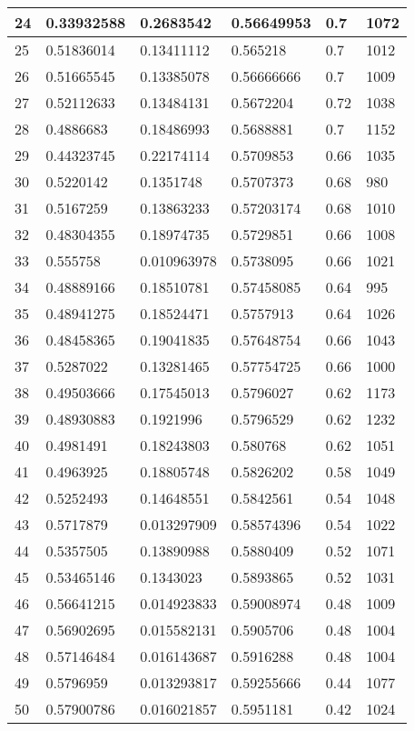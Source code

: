 \begin{longtable}{|l|l|l|l|l|l|}
24 & 0.33932588 & 0.2683542 & 0.56649953 & 0.7 & 1072 \\ \hline 
25 & 0.51836014 & 0.13411112 & 0.565218 & 0.7 & 1012 \\ \hline 
26 & 0.51665545 & 0.13385078 & 0.56666666 & 0.7 & 1009 \\ \hline 
27 & 0.52112633 & 0.13484131 & 0.5672204 & 0.72 & 1038 \\ \hline 
28 & 0.4886683 & 0.18486993 & 0.5688881 & 0.7 & 1152 \\ \hline 
29 & 0.44323745 & 0.22174114 & 0.5709853 & 0.66 & 1035 \\ \hline 
30 & 0.5220142 & 0.1351748 & 0.5707373 & 0.68 & 980 \\ \hline 
31 & 0.5167259 & 0.13863233 & 0.57203174 & 0.68 & 1010 \\ \hline 
32 & 0.48304355 & 0.18974735 & 0.5729851 & 0.66 & 1008 \\ \hline 
33 & 0.555758 & 0.010963978 & 0.5738095 & 0.66 & 1021 \\ \hline 
34 & 0.48889166 & 0.18510781 & 0.57458085 & 0.64 & 995 \\ \hline 
35 & 0.48941275 & 0.18524471 & 0.5757913 & 0.64 & 1026 \\ \hline 
36 & 0.48458365 & 0.19041835 & 0.57648754 & 0.66 & 1043 \\ \hline 
37 & 0.5287022 & 0.13281465 & 0.57754725 & 0.66 & 1000 \\ \hline 
38 & 0.49503666 & 0.17545013 & 0.5796027 & 0.62 & 1173 \\ \hline 
39 & 0.48930883 & 0.1921996 & 0.5796529 & 0.62 & 1232 \\ \hline 
40 & 0.4981491 & 0.18243803 & 0.580768 & 0.62 & 1051 \\ \hline 
41 & 0.4963925 & 0.18805748 & 0.5826202 & 0.58 & 1049 \\ \hline 
42 & 0.5252493 & 0.14648551 & 0.5842561 & 0.54 & 1048 \\ \hline 
43 & 0.5717879 & 0.013297909 & 0.58574396 & 0.54 & 1022 \\ \hline 
44 & 0.5357505 & 0.13890988 & 0.5880409 & 0.52 & 1071 \\ \hline 
45 & 0.53465146 & 0.1343023 & 0.5893865 & 0.52 & 1031 \\ \hline 
46 & 0.56641215 & 0.014923833 & 0.59008974 & 0.48 & 1009 \\ \hline 
47 & 0.56902695 & 0.015582131 & 0.5905706 & 0.48 & 1004 \\ \hline 
48 & 0.57146484 & 0.016143687 & 0.5916288 & 0.48 & 1004 \\ \hline 
49 & 0.5796959 & 0.013293817 & 0.59255666 & 0.44 & 1077 \\ \hline 
50 & 0.57900786 & 0.016021857 & 0.5951181 & 0.42 & 1024 \\ \hline 
\end{longtable}